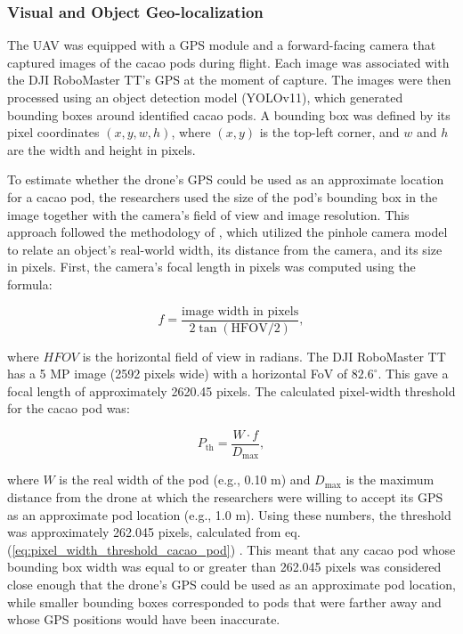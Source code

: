 \subsubsection*{Visual and Object Geo-localization}

The UAV was equipped with a GPS module and a forward-facing camera that captured images of the cacao pods during flight. Each image was associated with the DJI RoboMaster TT’s GPS at the moment of capture. The images were then processed using an object detection model (YOLOv11), which generated bounding boxes around identified cacao pods. A bounding box was defined by its pixel coordinates $(x, y, w, h)$, where $(x, y)$ is the top-left corner, and $w$ and $h$ are the width and height in pixels.

To estimate whether the drone's GPS could be used as an approximate location for a cacao pod, the researchers used the size of the pod's bounding box in the image together with the camera's field of view and image resolution. This approach followed the methodology of \cite{leorna2022estimating}, which utilized the pinhole camera model to relate an object's real-world width, its distance from the camera, and its size in pixels. First, the camera's focal length in pixels was computed using the formula:

\begin{equation}
	f = \frac{\text{image width in pixels}}{2\tan(\text{HFOV}/2)},
\end{equation}

where $HFOV$ is the horizontal field of view in radians. The DJI RoboMaster TT has a 5 MP image (2592 pixels wide) with a horizontal FoV of $82.6^\circ$. This gave a focal length of approximately 2620.45 pixels. The calculated pixel-width threshold for the cacao pod was:

\begin{equation}
	\label{eq:pixel_width_threshold_cacao_pod}
	P_{\text{th}} = \frac{W \cdot f}{D_{\max}},
\end{equation}

where $W$ is the real width of the pod (e.g., 0.10 m) and $D_{\max}$ is the maximum distance from the drone at which the researchers were willing to accept its GPS as an approximate pod location (e.g., 1.0 m). Using these numbers, the threshold was approximately 262.045 pixels, calculated from eq. (\ref{eq:pixel_width_threshold_cacao_pod}) \citep{leorna2022estimating}. This meant that any cacao pod whose bounding box width was equal to or greater than 262.045 pixels was considered close enough that the drone's GPS could be used as an approximate pod location, while smaller bounding boxes corresponded to pods that were farther away and whose GPS positions would have been inaccurate.

